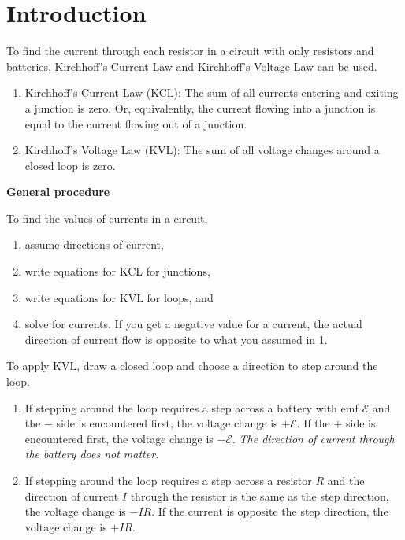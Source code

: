 \documentclass{article}
\begin{document}
\section{Introduction}

To find the current through each resistor in a circuit with only resistors and batteries, Kirchhoff's Current Law and Kirchhoff's Voltage Law can be used.

\begin{enumerate}

  \item Kirchhoff's Current Law (KCL): The sum of all currents entering and exiting a junction is zero. Or, equivalently, the current flowing into a junction is equal to the current flowing out of a junction.

  \item Kirchhoff's Voltage Law (KVL): The sum of all voltage changes around a closed loop is zero.

\end{enumerate}

\textbf{General procedure}

To find the values of currents in a circuit, 

\begin{enumerate}

  \item assume directions of current,

  \item write equations for KCL for junctions,

  \item write equations for KVL for loops, and

  \item solve for currents. If you get a negative value for a current, the actual direction of current flow is opposite to what you assumed in 1.

\end{enumerate}

To apply KVL, draw a closed loop and choose a direction to step around the loop. 

\begin{enumerate}

  \item If stepping around the loop requires a step across a battery with emf $\mathcal{E}$ and the $-$ side is encountered first, the voltage change is $+\mathcal{E}$. If the $+$ side is encountered first, the voltage change is $-\mathcal{E}$. \emph{The direction of current through the battery does not matter.}

  \item If stepping around the loop requires a step across a resistor $R$ and the direction of current $I$ through the resistor is the same as the step direction, the voltage change is $-IR$. If the current is opposite the step direction, the voltage change is $+IR$.

\end{enumerate}
\end{document}
